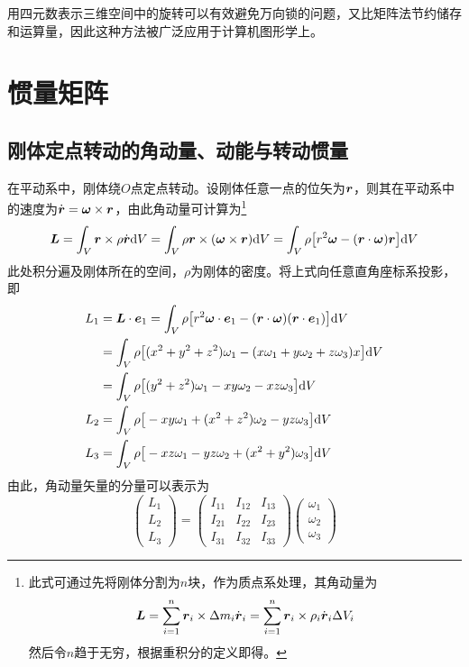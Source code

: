 用四元数表示三维空间中的旋转可以有效避免万向锁的问题，又比矩阵法节约储存和运算量，因此这种方法被广泛应用于计算机图形学上。

\section{惯量矩阵}

\subsection{刚体定点转动的角动量、动能与转动惯量}

在平动系中，刚体绕$O$点定点转动。设刚体任意一点的位矢为$\boldsymbol{r}$，则其在平动系中的速度为$\dot{\boldsymbol{r}} = \boldsymbol{\omega} \times \boldsymbol{r}$，由此角动量可计算为\footnote{此式可通过先将刚体分割为$n$块，作为质点系处理，其角动量为\begin{equation*} \boldsymbol{L} = \sum_{i=1}^n \boldsymbol{r}_i \times \Delta m_i \dot{\boldsymbol{r}}_i = \sum_{i=1}^n \boldsymbol{r}_i \times \rho_i \dot{\boldsymbol{r}}_i \Delta V_i \end{equation*}然后令$n$趋于无穷，根据重积分的定义即得。}
\begin{align*}
	\boldsymbol{L} = \int_V \boldsymbol{r} \times \rho \dot{\boldsymbol{r}} \mathrm{d} V = \int_V \rho \boldsymbol{r} \times (\boldsymbol{\omega} \times \boldsymbol{r}) \mathrm{d} V = \int_V \rho \big[r^2 \boldsymbol{\omega} - (\boldsymbol{r} \cdot \boldsymbol{\omega}) \boldsymbol{r} \big] \mathrm{d} V
\end{align*}
此处积分遍及刚体所在的空间，$\rho$为刚体的密度。将上式向任意直角座标系投影，即
\begin{align*}
	L_1 & = \boldsymbol{L} \cdot \boldsymbol{e}_1 = \int_V \rho \big[r^2 \boldsymbol{\omega} \cdot \boldsymbol{e}_1 - (\boldsymbol{r} \cdot \boldsymbol{\omega}) (\boldsymbol{r} \cdot \boldsymbol{e}_1) \big] \mathrm{d} V \\
	& = \int_V \rho \big[(x^2+y^2+z^2) \omega_1 - (x \omega_1 + y\omega_2 + z\omega_3) x \big] \mathrm{d} V \\
	& = \int_V \rho \big[(y^2+z^2)\omega_1 - xy \omega_2 - xz \omega_3\big] \mathrm{d} V \\
	L_2 & = \int_V \rho \big[-xy \omega_1 + (x^2+z^2)\omega_2 - yz \omega_3\big] \mathrm{d} V \\
	L_3 & = \int_V \rho \big[-xz \omega_1 - yz \omega_2 + (x^2+y^2)\omega_3\big] \mathrm{d} V
\end{align*}
由此，角动量矢量的分量可以表示为
\begin{equation}
	\begin{pmatrix} L_1 \\ L_2 \\ L_3 \end{pmatrix} = \begin{pmatrix} I_{11} & I_{12} & I_{13} \\ I_{21} & I_{22} & I_{23} \\ I_{31} & I_{32} & I_{33} \end{pmatrix} \begin{pmatrix} \omega_1 \\ \omega_2 \\ \omega_3 \end{pmatrix}
\end{equation}
